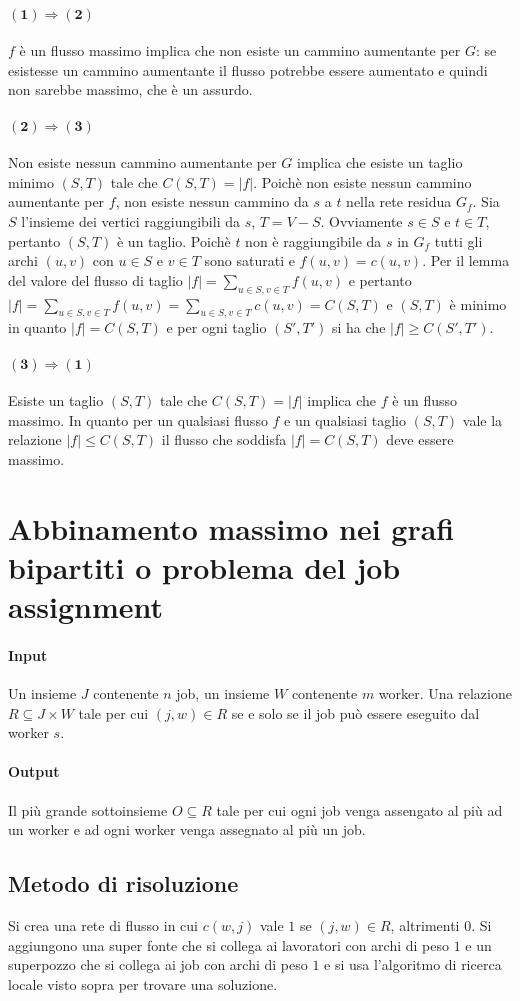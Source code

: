 \paragraph{$\mathbf{(1)\Rightarrow(2)}$}
$f$ \`e un flusso massimo implica che non esiste un cammino aumentante per $G$: se esistesse un cammino aumentante il flusso potrebbe essere aumentato e quindi non sarebbe massimo, che
\`e un assurdo.
\paragraph{$\mathbf{(2)\Rightarrow(3)}$}
Non esiste nessun cammino aumentante per $G$ implica che esiste un taglio minimo $(S, T)$ tale che $C(S, T)=|f|$. Poich\`e non esiste nessun cammino aumentante per $f$, non esiste nessun
cammino da $s$ a $t$ nella rete residua $G_f$. Sia $S$ l'insieme dei vertici raggiungibili da $s$, $T=V-S$. Ovviamente $s\in S$ e $t\in T$, pertanto $(S, T)$ \`e un taglio. Poich\`e
$t$ non \`e raggiungibile da $s$ in $G_f$ tutti gli archi $(u, v)$ con $u\in S$ e $v\in T$ sono saturati e $f(u, v) = c(u, v)$. Per il lemma del valore del flusso di taglio
$|f| = \sum\limits_{u\in S, v\in T} f(u, v)$ e pertanto $|f|=\sum\limits_{u\in S, v\in T}f(u, v) = \sum\limits_{u\in S, v\in T}c(u, v) = C(S, T)$ e $(S, T)$ \`e minimo in quanto $|f| = 
C(S, T)$ e per ogni taglio $(S', T')$ si ha che $|f|\ge C(S', T')$. 
\paragraph{$\mathbf{(3)\Rightarrow(1)}$}
Esiste un taglio $(S, T)$ tale che $C(S, T) = |f|$ implica che $f$ \`e un flusso massimo. In quanto per un qualsiasi flusso $f$ e un qualsiasi taglio $(S, T)$ vale la relazione
$|f|\le C(S, T)$ il flusso che soddisfa $|f|=C(S, T)$ deve essere massimo. 
\section{Abbinamento massimo nei grafi bipartiti o problema del job assignment}
\paragraph{Input}
Un insieme $J$ contenente $n$ job, un insieme $W$ contenente $m$ worker. Una relazione $R\subseteq J\times W$ tale per cui $(j, w)\in R$ se e solo se il job pu\`o essere eseguito dal
worker $s$.
\paragraph{Output}
Il pi\`u grande sottoinsieme $O\subseteq R$ tale per cui ogni job venga assengato al pi\`u ad un worker e ad ogni worker venga assegnato al pi\`u un job.
\subsection{Metodo di risoluzione}
Si crea una rete di flusso in cui $c(w, j)$ vale $1$ se $(j, w)\in R$, altrimenti $0$. Si aggiungono una super fonte che si collega ai lavoratori con archi di peso $1$ e un
superpozzo che si collega ai job con archi di peso $1$ e si usa l'algoritmo di ricerca locale visto sopra per trovare una soluzione.



